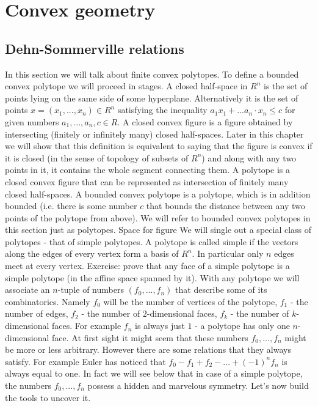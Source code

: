 \chapter{Convex geometry}
\section{Dehn-Sommerville relations}
In this section we will talk about finite convex polytopes. To define a bounded convex polytope we will proceed in stages.
A closed half-space in $R^n$ is the set of points lying on the same side of some hyperplane. Alternatively it is the set of points $x=(x_1,...,x_n)\in R^n$ satisfying the inequality $a_1 x_1 + ... a_n\cdot x_n \le c$ for given numbers $a_1,...,a_n,c\in R$.
A closed convex figure is a figure obtained by intersecting (finitely or infinitely many) closed half-spaces. Later in this chapter we will show that this definition is equivalent to saying that the figure is convex if it is closed (in the sense of topology of subsets of $R^n$) and along with any two points in it, it contains the whole segment connecting them.
A polytope is a closed convex figure that can be represented as intersection of finitely many closed half-spaces.
A bounded convex polytope is a polytope, which is in addition bounded (i.e. there is some number $c$ that bounds the distance between any two points of the polytope from above).
We will refer to bounded convex polytopes in this section just as polytopes.
Space for figure
We will single out a special class of polytopes - that of simple polytopes. A polytope is called simple if the vectors along the edges of every vertex form a basis of $R^n$. In particular only $n$ edges meet at every vertex.
Exercise: prove that any face of a simple polytope is a simple polytope (in the affine space spanned by it).
With any polytope we will associate an $n$-tuple of numbers $(f_0,...,f_n)$ that describe some of its combinatorics. Namely $f_0$ will be the number of vertices of the polytope, $f_1$ - the number of edges, $f_2$ - the number of $2$-dimensional faces, $f_k$ - the number of $k$-dimensional faces. For example $f_n$ is always just $1$ - a polytope has only one $n$-dimensional face.
At first sight it might seem that these numbers $f_0,...,f_n$ might be more or less arbitrary. However there are some relations that they always satisfy. For example Euler has noticed that $f_0-f_1+f_2-...+(-1)^n f_n$ is always equal to one.
In fact we will see below that in case of a simple polytope, the numbers $f_0,...,f_n$ possess a hidden and marvelous symmetry. Let's now build the tools to uncover it.
